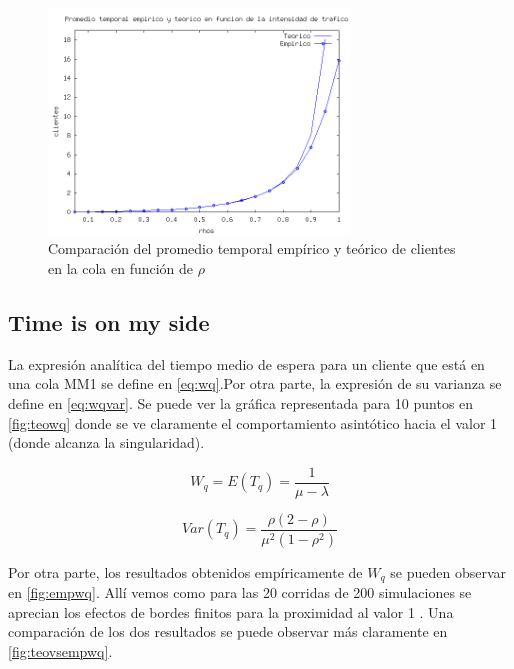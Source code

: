 \documentclass{sig-alternate}
\begin{document}
\begin{figure}[ht]
\begin{center}
\includegraphics[width=8cm]{teoricoVSempirico}
\caption{\label{fig:meanQueueVS} Comparaci\'on del promedio temporal emp\'irico y te\'orico de clientes en la cola en funci\'on de $\rho$}
\end{center}
\end{figure}

\newpage

\subsection{Time is on my side}
\label{sec:parte2}

La expresión analítica del tiempo medio de espera para un cliente que está en una cola MM1 se define en  \eqref{eq:wq}.Por otra parte, la expresión de su varianza se define en \eqref{eq:wqvar}. Se puede ver la gráfica representada para 10 puntos en \ref{fig:teowq} donde se ve claramente el comportamiento asintótico hacia el valor 1 (donde alcanza la singularidad).

\begin{equation}
\label{eq:wq}
  W_q = E (T_q)= \frac{1}{\mu-\lambda}
\end{equation}

\begin{equation}
\label{eq:wqvar}
  Var(T_q) = \frac{\rho(2-\rho)}{\mu^2(1-\rho^2)}
\end{equation}

Por otra parte, los resultados obtenidos empíricamente de $W_q$ se pueden observar en \ref{fig:empwq}. Allí vemos como para las 20 corridas de 200 simulaciones se aprecian los efectos de bordes finitos para la proximidad al valor 1 . Una comparación de los dos resultados se puede observar más claramente en \ref{fig:teovsempwq}.
\end{document}
